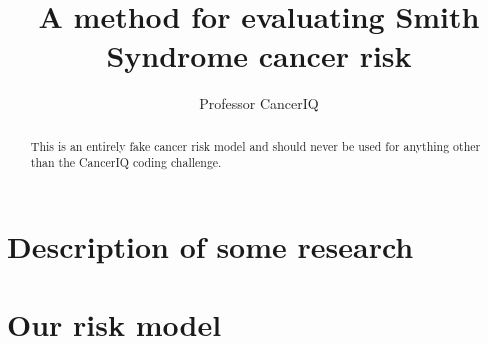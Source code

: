 \documentclass[review]{elsarticle}
\begin{document}
\begin{frontmatter}

\title{A method for evaluating Smith Syndrome cancer risk}

\author{Professor CancerIQ}
\address{541 N Fairbanks Ct, 22nd Floor, Chicago, IL 60611}

\begin{abstract}
This is an entirely fake cancer risk model and should never be used for anything other than the CancerIQ coding challenge.
\end{abstract}

\end{frontmatter}

\section{Description of some research}

\blindtext[2]

\section{Our risk model}

\blindtext[1]
\end{document}

